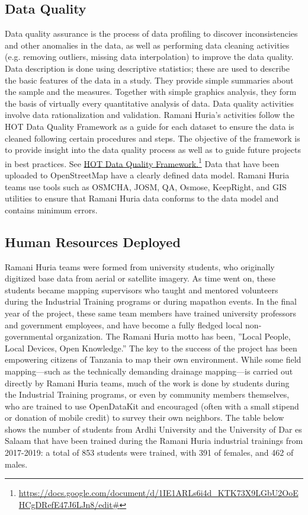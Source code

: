 \documentclass[a4paper,12pt,twoside]{article}
\begin{document}
\subsection{Data Quality}

Data quality assurance is the process of data profiling to discover inconsistencies and other anomalies in the data, as well as performing data cleaning activities (e.g. removing outliers, missing data interpolation) to improve the data quality. Data description is done using descriptive statistics; these are used to describe the basic features of the data in a study. They provide simple summaries about the sample and the measures. Together with simple graphics analysis, they form the basis of virtually every quantitative analysis of data.
Data quality activities involve data rationalization and validation. Ramani Huria's activities follow the HOT Data Quality Framework as a guide for each dataset to ensure the data is cleaned following certain procedures and steps. The objective of the framework is to provide insight into the data quality process as well as to guide future projects in best practices. See \href{https://docs.google.com/document/d/1IE1ARLs6i4d_KTK73X9LGbU2OoEHCgDRefE47J6LJn8/edit#}{HOT Data Quality Framework.}\footnote{\url{https://docs.google.com/document/d/1IE1ARLs6i4d_KTK73X9LGbU2OoEHCgDRefE47J6LJn8/edit#}}
Data that have been uploaded to OpenStreetMap have a clearly defined data model. Ramani Huria teams use tools such as OSMCHA, JOSM, QA, Osmose, KeepRight, and GIS utilities to ensure that Ramani Huria data conforms to the data model and contains minimum errors.

\subsection{Human Resources Deployed}

Ramani Huria teams were formed from university students, who originally digitized base data from aerial or satellite imagery.  As time went on, these students became mapping  supervisors who taught and mentored volunteers during the Industrial Training programs or during mapathon events. In the final year of the project, these same team members have trained university professors and government employees, and have become a fully fledged local non-governmental organization. 
The Ramani Huria motto has been, ”Local People, Local Devices, Open Knowledge.” The key to the success of the project has been empowering citizens of Tanzania to map their own environment. While some field mapping—such as the technically demanding drainage mapping—is carried out directly by Ramani Huria teams, much of the work is done by students during the Industrial Training programs, or even by community members themselves, who are trained to use OpenDataKit and encouraged (often with a small stipend or donation of mobile credit) to survey their own neighbors.
The table below shows the number of students from Ardhi University and the University of Dar es Salaam that have been trained during the Ramani Huria industrial trainings from 2017-2019: a total of 853 students were trained, with 391 of females, and 462 of males.
\end{document}
